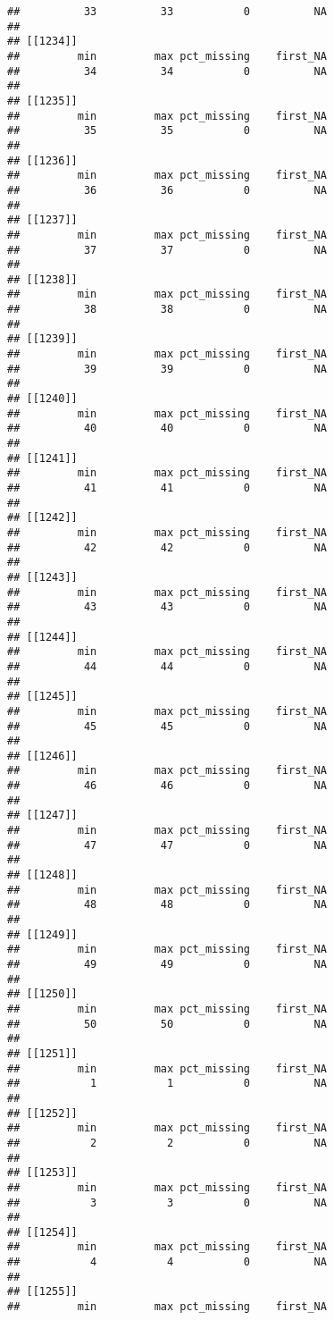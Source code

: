 \documentclass[
]{article}
\begin{document}
\begin{verbatim}
##          33          33           0          NA 
## 
## [[1234]]
##         min         max pct_missing    first_NA 
##          34          34           0          NA 
## 
## [[1235]]
##         min         max pct_missing    first_NA 
##          35          35           0          NA 
## 
## [[1236]]
##         min         max pct_missing    first_NA 
##          36          36           0          NA 
## 
## [[1237]]
##         min         max pct_missing    first_NA 
##          37          37           0          NA 
## 
## [[1238]]
##         min         max pct_missing    first_NA 
##          38          38           0          NA 
## 
## [[1239]]
##         min         max pct_missing    first_NA 
##          39          39           0          NA 
## 
## [[1240]]
##         min         max pct_missing    first_NA 
##          40          40           0          NA 
## 
## [[1241]]
##         min         max pct_missing    first_NA 
##          41          41           0          NA 
## 
## [[1242]]
##         min         max pct_missing    first_NA 
##          42          42           0          NA 
## 
## [[1243]]
##         min         max pct_missing    first_NA 
##          43          43           0          NA 
## 
## [[1244]]
##         min         max pct_missing    first_NA 
##          44          44           0          NA 
## 
## [[1245]]
##         min         max pct_missing    first_NA 
##          45          45           0          NA 
## 
## [[1246]]
##         min         max pct_missing    first_NA 
##          46          46           0          NA 
## 
## [[1247]]
##         min         max pct_missing    first_NA 
##          47          47           0          NA 
## 
## [[1248]]
##         min         max pct_missing    first_NA 
##          48          48           0          NA 
## 
## [[1249]]
##         min         max pct_missing    first_NA 
##          49          49           0          NA 
## 
## [[1250]]
##         min         max pct_missing    first_NA 
##          50          50           0          NA 
## 
## [[1251]]
##         min         max pct_missing    first_NA 
##           1           1           0          NA 
## 
## [[1252]]
##         min         max pct_missing    first_NA 
##           2           2           0          NA 
## 
## [[1253]]
##         min         max pct_missing    first_NA 
##           3           3           0          NA 
## 
## [[1254]]
##         min         max pct_missing    first_NA 
##           4           4           0          NA 
## 
## [[1255]]
##         min         max pct_missing    first_NA 

\end{verbatim}
\end{document}
